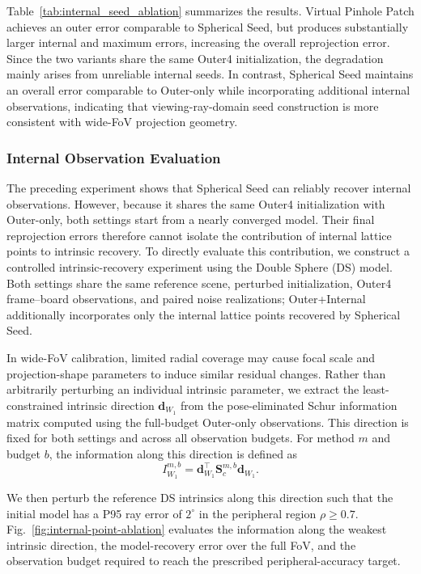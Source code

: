 \documentclass[letterpaper, 10 pt, conference]{ieeeconf}  %
\begin{document}
Table~\ref{tab:internal_seed_ablation} summarizes the results. Virtual
Pinhole Patch achieves an outer error comparable to Spherical Seed, but
produces substantially larger internal and maximum errors, increasing
the overall reprojection error. Since the two variants share the same
Outer4 initialization, the degradation mainly arises from unreliable
internal seeds. In contrast, Spherical Seed maintains an overall error
comparable to Outer-only while incorporating additional internal
observations, indicating that viewing-ray-domain seed construction is
more consistent with wide-FoV projection geometry.

\subsubsection{Internal Observation Evaluation}

The preceding experiment shows that Spherical Seed can reliably recover
internal observations. However, because it shares the same Outer4
initialization with Outer-only, both settings start from a nearly
converged model. Their final reprojection errors therefore cannot isolate
the contribution of internal lattice points to intrinsic recovery. To
directly evaluate this contribution, we construct a controlled
intrinsic-recovery experiment using the Double Sphere (DS) model. Both
settings share the same reference scene, perturbed initialization,
Outer4 frame--board observations, and paired noise realizations;
Outer+Internal additionally incorporates only the internal lattice
points recovered by Spherical Seed.

In wide-FoV calibration, limited radial coverage may cause focal scale
and projection-shape parameters to induce similar residual changes.
Rather than arbitrarily perturbing an individual intrinsic parameter,
we extract the least-constrained intrinsic direction
$\mathbf{d}_{W_1}$ from the pose-eliminated Schur information matrix
computed using the full-budget Outer-only observations. This direction
is fixed for both settings and across all observation budgets. For
method $m$ and budget $b$, the information along this direction is
defined as
\begin{equation}
I_{W_1}^{m,b}
=
\mathbf{d}_{W_1}^{\top}
\mathbf{S}_c^{m,b}
\mathbf{d}_{W_1}.
\end{equation}

We then perturb the reference DS intrinsics along this direction such
that the initial model has a P95 ray error of $2^\circ$ in the
peripheral region $\rho \geq 0.7$. Fig.~\ref{fig:internal-point-ablation}
evaluates the information along the weakest intrinsic direction, the
model-recovery error over the full FoV, and the observation budget
required to reach the prescribed peripheral-accuracy target.
\end{document}
